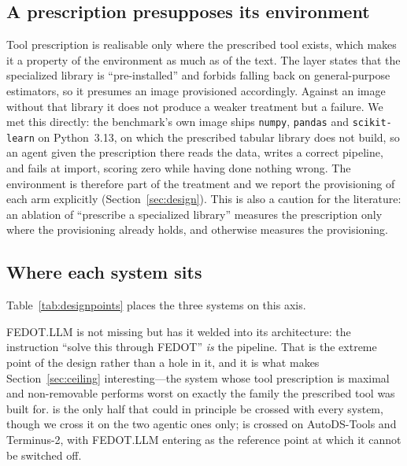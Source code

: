 \subsection{A prescription presupposes its environment}

Tool prescription is realisable only where the prescribed tool exists, which
makes it a property of the environment as much as of the text. The layer states
that the specialized library is ``pre-installed'' and forbids falling back on
general-purpose estimators, so it presumes an image provisioned accordingly.
Against an image without that library it does not produce a weaker treatment but
a failure. We met this directly: the benchmark's own image ships \texttt{numpy},
\texttt{pandas} and \texttt{scikit-learn} on Python~3.13, on which the prescribed
tabular library does not build, so an agent given the prescription there reads
the data, writes a correct pipeline, and fails at import, scoring zero while
having done nothing wrong. The environment is therefore part of the treatment and
we report the provisioning of each arm explicitly
(Section~\ref{sec:design}). This is also a caution for the literature: an
ablation of ``prescribe a specialized library'' measures the prescription only
where the provisioning already holds, and otherwise measures the provisioning.

\subsection{Where each system sits}

Table~\ref{tab:designpoints} places the three systems on this axis.

FEDOT.LLM is not missing \Ktool{} but has it welded into its architecture: the
instruction ``solve this through FEDOT'' \emph{is} the pipeline. That is the
extreme point of the design rather than a hole in it, and it is what makes
Section~\ref{sec:ceiling} interesting---the system whose tool prescription is
maximal and non-removable performs worst on exactly the family the prescribed
tool was built for. \Kdisc{} is the only half that could in principle be crossed
with every system, though we cross it on the two agentic ones only;
\Ktool{} is crossed on AutoDS-Tools and Terminus-2, with FEDOT.LLM entering as
the reference point at which it cannot be switched off.
